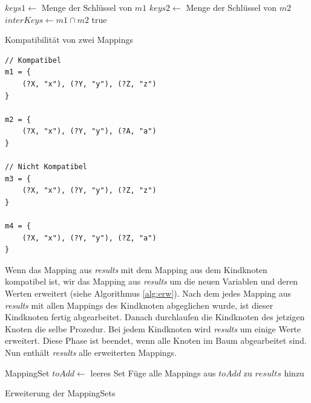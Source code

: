 \documentclass[draft,final]{vutinfth} %
\begin{document}
\begin{algorithm}
\BlankLine
$keys1\leftarrow$ Menge der Schlüssel von $m1$\;
$keys2\leftarrow$ Menge der Schlüssel von $m2$\;
$interKeys\leftarrow m1\cap m2$\;
\Return true\;
\caption{Kompatibilität von zwei Mappings}\label{alg:komp}
\end{algorithm}

\begin{lstlisting}[float,caption={Beispiele für Kompatibilität von zwei Mappings},frame=single,label={bspKompMap}]
// Kompatibel
m1 = {
	(?X, "x"), (?Y, "y"), (?Z, "z")	
}

m2 = {
	(?X, "x"), (?Y, "y"), (?A, "a")	
}

// Nicht Kompatibel
m3 = {
	(?X, "x"), (?Y, "y"), (?Z, "z")	
}

m4 = {
	(?X, "x"), (?Y, "y"), (?Z, "a")	
}
\end{lstlisting}

Wenn das Mapping aus \textit{results} mit dem Mapping aus dem Kindknoten kompatibel ist, wir das Mapping aus \textit{results} um die neuen Variablen und deren Werten erweitert (siehe Algorithmus \ref{alg:erw}). Nach dem jedes Mapping aus \textit{results} mit allen Mappings des Kindknoten abgeglichen wurde, ist dieser Kindknoten fertig abgearbeitet. Danach durchlaufen die Kindknoten des jetzigen Knoten die selbe Prozedur. Bei jedem Kindknoten wird \textit{results} um einige Werte erweitert. Diese Phase ist beendet, wenn alle Knoten im Baum abgearbeitet sind. Nun enthält \textit{results} alle erweiterten Mappings.

\begin{algorithm}
\BlankLine
MappingSet $toAdd \leftarrow$ leeres Set\;
Füge alle Mappings aus $toAdd$ zu $results$ hinzu\;
\caption{Erweiterung der MappingSets}\label{alg:erw}
\end{algorithm}
\end{document}
